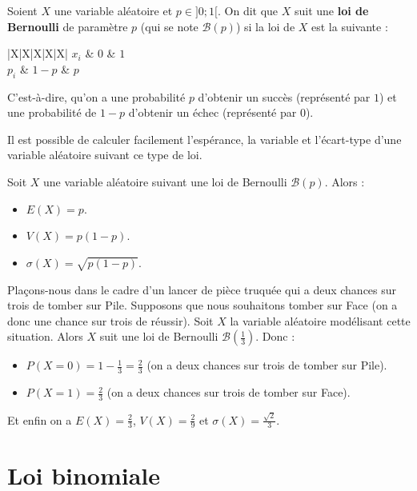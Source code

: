 	\begin{formula}[Définition]
		Soient $X$ une variable aléatoire et $p \in ]0; 1[$. On dit que $X$ suit une \textbf{loi de Bernoulli} de paramètre $p$ (qui se note $\mathcal{B}(p)$) si la loi de $X$ est la suivante :
		\newpar
		\begin{whitetabularx}{|X|X|X|X|X|}
			\hline
			$x_i$ & $0$ & $1$ \\
			\hline
			$p_i$ & $1 - p$ & $p$ \\
			\hline
		\end{whitetabularx}
		\newpar
		C'est-à-dire, qu'on a une probabilité $p$ d'obtenir un succès (représenté par $1$) et une probabilité de $1-p$ d'obtenir un échec (représenté par $0$).
	\end{formula}
	
	Il est possible de calculer facilement l'espérance, la variable et l'écart-type d'une variable aléatoire suivant ce type de loi.
	
	\begin{formula}
		Soit $X$ une variable aléatoire suivant une loi de Bernoulli $\mathcal{B}(p)$. Alors :
		\begin{itemize}
			\item $E(X) = p$.
			\item $V(X) = p(1-p)$.
			\item $\sigma(X) = \sqrt{p(1-p)}$.
		\end{itemize}
	\end{formula}
	
	\begin{tip}[Exemple]
		Plaçons-nous dans le cadre d'un lancer de pièce truquée qui a deux chances sur trois de tomber sur Pile. Supposons que nous souhaitons tomber sur Face (on a donc une chance sur trois de réussir).
		\newpar
		Soit $X$ la variable aléatoire modélisant cette situation. Alors $X$ suit une loi de Bernoulli $\mathcal{B}\left(\frac{1}{3}\right)$. Donc :
		\begin{itemize}
			\item $P(X = 0) = 1 - \frac{1}{3} = \frac{2}{3}$ (on a deux chances sur trois de tomber sur Pile).
			\item $P(X = 1) = \frac{2}{3}$ (on a deux chances sur trois de tomber sur Face).
		\end{itemize}
		Et enfin on a $E(X) = \frac{2}{3}$, $V(X) = \frac{2}{9}$ et $\sigma(X) = \frac{\sqrt{2}}{3}$.
	\end{tip}
	
	\section{Loi binomiale}
	
